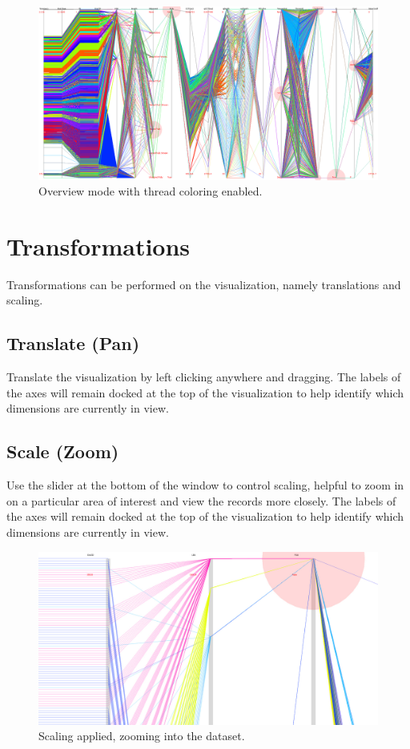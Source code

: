 \documentclass[12pt]{ucthesis}
\begin{document}
\begin{figure}[htb!]
 \centering
 \includegraphics[width=\textwidth]{images/documentation/color_overview.jpg}
 \caption[Overview mode with thread coloring enabled.]{Overview mode with thread coloring enabled.}
 \label{fig:doc}
\end{figure}

\clearpage

\section{Transformations}
Transformations can be performed on the visualization, namely translations and scaling.

\subsection{Translate (Pan)}
Translate the visualization by left clicking anywhere and dragging. The labels of the axes will remain docked at the top of the visualization to help identify which dimensions are currently in view.

\subsection{Scale (Zoom)}
Use the slider at the bottom of the window to control scaling, helpful to zoom in on a particular area of interest and view the records more closely. The labels of the axes will remain docked at the top of the visualization to help identify which dimensions are currently in view.

\begin{figure}[htb!]
 \centering
 \includegraphics[width=\textwidth]{images/documentation/scale.jpg}
 \caption[Scaling applied, zooming into the dataset.]{Scaling applied, zooming into the dataset.}
 \label{fig:doc}
\end{figure}
\end{document}
